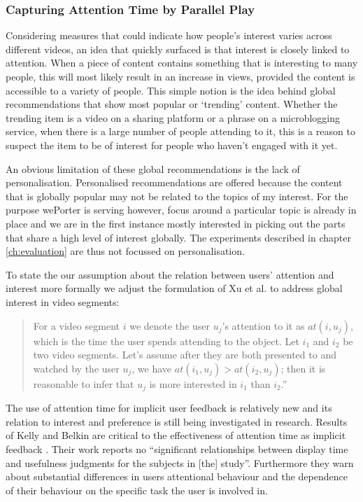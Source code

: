 \subsubsection{Capturing Attention Time by Parallel Play}

Considering measures that could indicate how people's interest varies across different videos, an idea that quickly surfaced is that interest is closely linked to attention. When a piece of content contains something that is interesting to many people, this will most likely result in an increase in views, provided the content is accessible to a variety of people. This simple notion is the idea behind global recommendations that show most popular or `trending' content. Whether the trending item is a video on a sharing platform or a phrase on a microblogging service, when there is a large number of people attending to it, this is a reason to suspect the item to be of interest for people who haven't engaged with it yet. 

An obvious limitation of these global recommendations is the lack of personalisation. Personalised recommendations are offered because the content that is globally popular may not be related to the topics of my interest. For the purpose wePorter is serving however, focus around a particular topic is already in place and we are in the first instance mostly interested in picking out the parts that share a high level of interest globally. The experiments described in chapter \ref{ch:evaluation} are thus not focussed on personalisation. 

To state the our assumption about the relation between users' attention and interest more formally we adjust the formulation of Xu et al. to address global interest in video segments:

\begin{quote}
  For a video segment $i$ we denote the user $u_j$’s attention to it as $at(i, u_j)$, which is the time the user spends attending to the object. Let $i_1$ and $i_2$ be two video segments. Let's assume after they are both presented to and watched by the user $u_j$, we have $at(i_1,u_j) > at(i_2,u_j)$; then it is reasonable to infer that $u_j$ is more interested in $i_1$ than $i_2$.''
\end{quote}

The use of attention time for implicit user feedback is relatively new and its relation to interest and preference is still being investigated in research. Results of Kelly and Belkin are critical to the effectiveness of attention time as implicit feedback \cite{Kelly:2001ui,Kelly:2004tq}. Their work reports no ``significant relationships between display time and usefulness judgments for the subjects in [the] study''. Furthermore they warn about substantial differences in users attentional behaviour and the dependence of their behaviour on the specific task the user is involved in.


